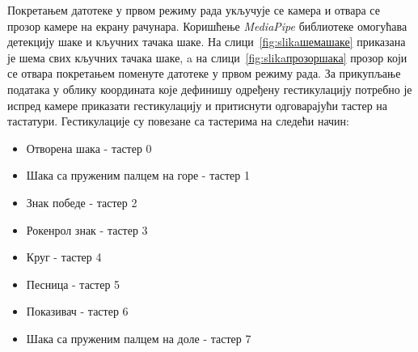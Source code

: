 \documentclass[master]{finthesis}
\begin{document}
Покретањем датотеке у првом режиму рада укључује се камера и отвара се прозор камере на екрану рачунара. Коришћење \textit{MediaPipe} библиотеке омогућава детекцију шаке и кључних тачака шаке. На слици~\ref{fig:slikaшемашаке} приказана је шема свих кључних тачака шаке, a на слици~\ref{fig:slikaпрозоршака} прозор који се отвара покретањем поменуте датотеке у првом режиму рада. За прикупљање података у облику координата које дефинишу одређену гестикулацију потребно је испред камере приказати гестикулацију и притиснути одговарајући тастер на тастатури. Гестикулације су повезане са тастерима на следећи начин:

\begin{itemize}
  \item Отворена шака - тастер 0
  \item Шака са пруженим палцем на горе - тастер 1
  \item Знак победе - тастер 2
  \item Рокенрол знак - тастер 3
  \item Круг - тастер 4
  \item Песница - тастер 5
  \item Показивач - тастер 6
  \item Шака са пруженим палцем на доле - тастер 7
\end{itemize}


\vspace{2em}
\end{document}
